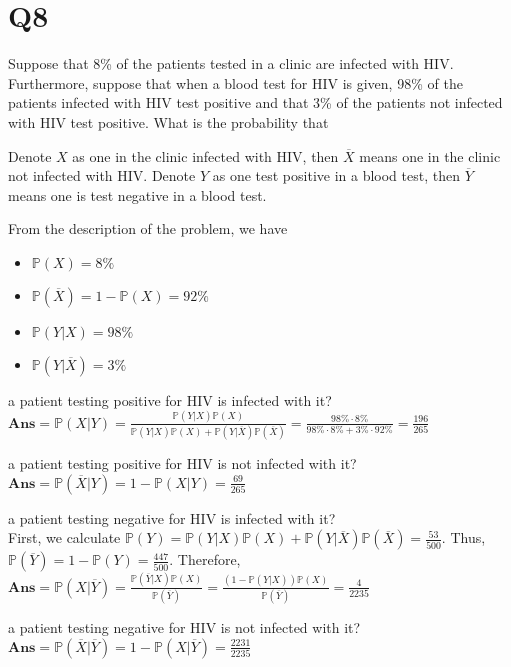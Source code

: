 \documentclass[11pt]{article}
\begin{document}
\section*{Q8}
Suppose that 8\% of the patients tested in a clinic are infected
with HIV. Furthermore, suppose that when a blood test for
HIV is given, 98\% of the patients infected with HIV test
positive and that 3\% of the patients not infected with HIV test
positive. What is the probability that
\begin{solution}
    Denote $X$ as one in the clinic infected with HIV, then $\overline{X}$ means 
    one in the clinic not infected with HIV.
    Denote $Y$ as one test positive in a blood test, then $\overline{Y}$ 
    means one is test negative in a blood test.

    From the description of the problem, we have 
    \begin{itemize}
        \item $\mathbb{P}(X)=8\%$ 
        \item $\mathbb{P}(\overline{X})=1-\mathbb{P}(X)=92\%$
        \item $\mathbb{P}(Y\vert X)=98\%$
        \item  $\mathbb{P}(Y\vert \overline{X})=3\%$
    \end{itemize}
\begin{qparts}
    \item a patient testing positive for HIV is infected with it?\\
    $\textbf{Ans}=\mathbb{P}(X\vert Y)=\frac{\mathbb{P}(Y\vert X)\mathbb{P}(X)}{\mathbb{P}(Y\vert X)\mathbb{P}(X)+\mathbb{P}(Y\vert \overline{X})\mathbb{P}(\overline{X})}=\frac{98\%\cdot 8\%}{98\%\cdot 8\%+3\%\cdot 92\%}=\frac{196}{265}$

    \item a patient testing positive for HIV is not infected with it?\\
    $\textbf{Ans}=\mathbb{P}(\overline{X}\vert Y)=1-\mathbb{P}(X\vert Y)=\frac{69}{265}$

    \item a patient testing negative for HIV is infected with it?\\
    First, we calculate $\mathbb{P}(Y)=\mathbb{P}(Y\vert X)\mathbb{P}(X)+\mathbb{P}(Y\vert \overline{X})\mathbb{P}(\overline{X})=\frac{53}{500}$. Thus, $\mathbb{P}(\overline{Y})=1-\mathbb{P}(Y)=\frac{447}{500}$.
    Therefore, $\textbf{Ans}=\mathbb{P}(X\vert \overline{Y})=\frac{\mathbb{P}(\overline{Y}\vert X)\mathbb{P}(X)}{\mathbb{P}(\overline{Y})}=\frac{(1-\mathbb{P}(Y\vert X))\mathbb{P}(X)}{\mathbb{P}(\overline{Y})}=\frac{4}{2235}$

    \item a patient testing negative for HIV is not infected with it?\\
    $\textbf{Ans}=\mathbb{P}(\overline{X}\vert \overline{Y})=1-\mathbb{P}(X\vert \overline{Y})=\frac{2231}{2235}$

\end{qparts}
\end{solution}
\end{document}
